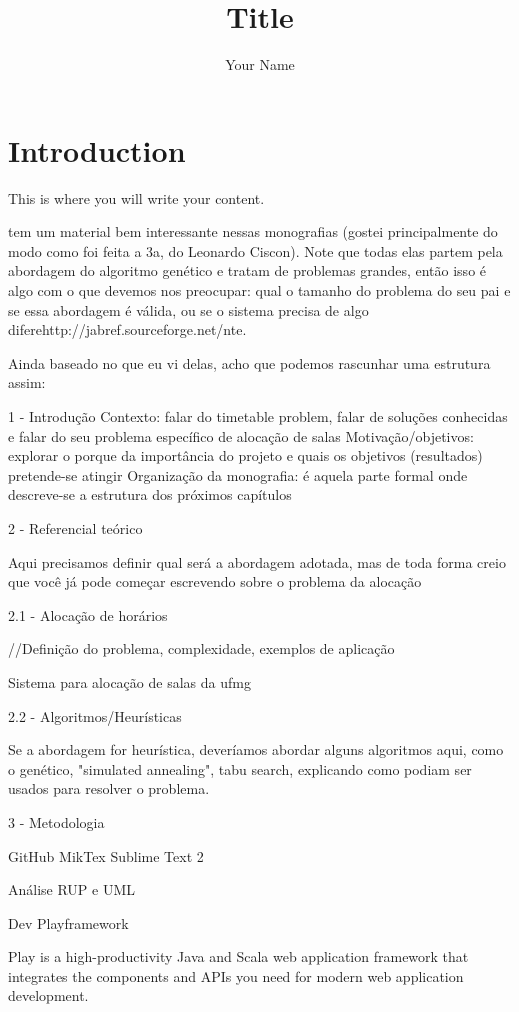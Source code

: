 \documentclass{article}
\title{Title}
\author{Your Name}
\begin{document}
 
\maketitle{}
 
\section{Introduction}
 
This is where you will write your content.
 



tem um material bem interessante nessas monografias (gostei
principalmente do modo como foi feita a 3a, do Leonardo Ciscon). Note
que todas elas partem pela abordagem do algoritmo genético e tratam de
problemas grandes, então isso é algo com o que devemos nos preocupar:
qual o tamanho do problema do seu pai e se essa abordagem é válida, ou
se o sistema precisa de algo diferehttp://jabref.sourceforge.net/nte.

Ainda baseado no que eu vi delas, acho que podemos rascunhar uma
estrutura assim:


1 - Introdução
Contexto: falar do timetable problem, falar de soluções conhecidas e
falar do seu problema específico de alocação de salas
Motivação/objetivos: explorar o porque da importância do projeto e
quais os objetivos (resultados) pretende-se atingir
Organização da monografia: é aquela parte formal onde descreve-se a
estrutura dos próximos capítulos

2 - Referencial teórico

Aqui precisamos definir qual será a abordagem adotada, mas de toda
forma creio que você já pode começar escrevendo sobre o problema da
alocação


2.1 - Alocação de horários

//Definição do problema, complexidade, exemplos de aplicação

Sistema para alocação de salas da ufmg


2.2 - Algoritmos/Heurísticas

Se a abordagem for heurística, deveríamos abordar alguns algoritmos
aqui, como o genético, "simulated annealing", tabu search, explicando
como podiam ser usados para resolver o problema.

3 - Metodologia

GitHub
MikTex
Sublime Text 2

Análise
RUP e UML

Dev
Playframework

Play is a high-productivity Java and Scala web application framework that integrates the components and APIs you need for modern web application development.
\end{document}
